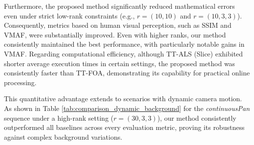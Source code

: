 \documentclass[a4paper, 11pt]{article}
\theoremstyle{plain}
\theoremstyle{definition}
\theoremstyle{remark}
\begin{document}
Furthermore, the proposed method significantly reduced mathematical errors even under strict low-rank constraints (e.g., $r=(10,10)$ and $r=(10,3,3)$).
Consequently, metrics based on human visual perception, such as SSIM and VMAF, were substantially improved.
Even with higher ranks, our method consistently maintained the best performance, with particularly notable gains in VMAF.
Regarding computational efficiency, although TT-ALS (Slice) exhibited shorter average execution times in certain settings, the proposed method was consistently faster than TT-FOA, demonstrating its capability for practical online processing.

This quantitative advantage extends to scenarios with dynamic camera motion. As shown in Table \ref{tab:comparison_dynamic_background} for the \textit{continuousPan} sequence under a high-rank setting ($r=(30,3,3)$), our method consistently outperformed all baselines across every evaluation metric, proving its robustness against complex background variations.
\end{document}
